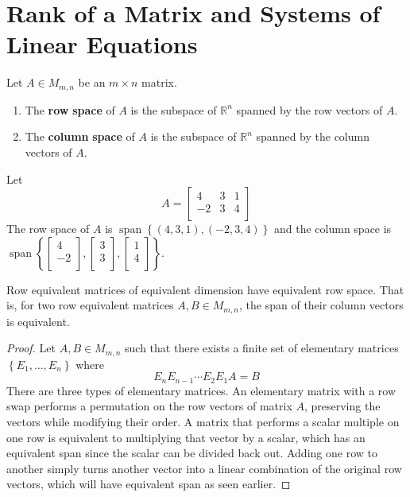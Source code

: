 \section{Rank of a Matrix and Systems of Linear Equations}
\begin{definition}
    Let \(A \in M_{m,n}\) be an \(m\times n\) matrix.
    \begin{enumerate}
        \item The \textbf{row} \textbf{space} of \(A\) is the subspace of \(\mathbb{R} ^n\) spanned by the row vectors of \(A\).
        \item The \textbf{column} \textbf{space} of \(A\) is the subspace of \(\mathbb{R} ^n\) spanned by the column vectors of \(A\).
    \end{enumerate}
\end{definition}
\begin{eg}
    Let
    \[A=\begin{bmatrix}
        4 &3  &1   \\
         -2&3  &4   \\
    \end{bmatrix}\]
    The row space of \(A\) is \(\operatorname{span}\left\{ (4,3,1),(-2,3,4) \right\}  \) and the column space is \(\operatorname{span}\left\{ \begin{bmatrix}
         4 \\
         -2 \\
    \end{bmatrix},\begin{bmatrix}
         3 \\
         3 \\
    \end{bmatrix},\begin{bmatrix}
         1 \\
         4 \\
    \end{bmatrix} \right\}  \).
\end{eg}
\begin{theorem}
    Row equivalent matrices of equivalent dimension have equivalent row space. That is, for two row equivalent matrices \(A,B\in M_{m,n}\), the span of their column vectors is equivalent.
\end{theorem}
\begin{proof}
    Let \(A,B\in M_{m,n}\) such that there exists a finite set of elementary matrices \(\left\{ E_1,\ldots,E_n \right\} \) where
    \[
        E_n E_{n-1}\cdots E_2 E_1 A=B
    \]
    There are three types of elementary matrices. An elementary matrix with a row swap performs a permutation on the row vectors of matrix \(A\), preserving the vectors while modifying their order. A matrix that performs a scalar multiple on one row is equivalent to multiplying that vector by a scalar, which has an equivalent span since the scalar can be divided back out. Adding one row to another simply turns another vector into a linear combination of the original row vectors, which will have equivalent span as seen earlier.
\end{proof}
